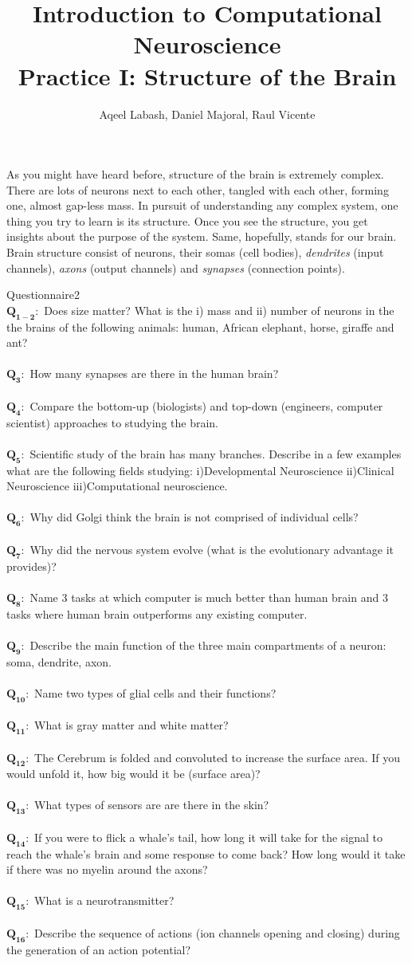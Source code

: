 \documentclass[a4paper,11pt]{article}
\author{\large{Aqeel Labash, Daniel Majoral, Raul Vicente}}
\title{\huge{Introduction to Computational Neuroscience}\\\LARGE{Practice I: Structure of the Brain}}
\newcommand{\question}[2]{\setlength\parindent{0mm}\ \\$\mathbf{Q_{#1}:}$ #2\ \\}
\begin{document}
\maketitle

As you might have heard before, structure of the brain is extremely complex. There are lots of neurons next to each other, tangled with each other, forming one, almost gap-less mass. In pursuit of understanding any complex system, one thing you try to learn is its structure. Once you see the structure, you get insights about the purpose of the system. Same, hopefully, stands for our brain. Brain structure consist of neurons, their somas (cell bodies), \emph{dendrites} (input channels), \emph{axons} (output channels) and \emph{synapses} (connection points). 


%
%
\begin{exercise}{1}{Questionnaire}{2}
\question{1-2}{Does size matter? What is the i) mass and ii) number of neurons in the the brains of the following animals: human, African elephant, horse, giraffe and ant?}
\question{3}{How many synapses are there in the human brain?}
\question{4}{Compare the bottom-up (biologists) and top-down (engineers, computer scientist) approaches to studying the brain.}
\question{5}{Scientific study of the brain has many branches. Describe in a few examples what are the following fields studying: i)Developmental Neuroscience ii)Clinical Neuroscience iii)Computational neuroscience.}
\question{6}{Why did Golgi think the brain is not comprised of individual cells?}
\question{7}{Why did the nervous system evolve (what is the evolutionary advantage it provides)?}
\question{8}{Name 3 tasks at which computer is much better than human brain and 3 tasks where human brain outperforms any existing computer.}
\question{9}{Describe the main function of the three main compartments of a neuron: soma, dendrite, axon.}
\question{10}{Name two types of glial cells and their functions?}
\question{11}{What is gray matter and white matter?}
\question{12}{The Cerebrum is folded and convoluted to increase the surface area. If you would unfold it, how big would it be (surface area)?}
\question{13}{What types of sensors are are there in the skin?}
\question{14}{If you were to flick a whale's tail, how long it will take for the signal to reach the whale's brain and some response to come back? How long would it take if there was no myelin around the axons? }
\question{15}{What is a neurotransmitter?}
\question{16}{Describe the sequence of actions (ion channels opening and closing) during the generation of an action potential?}
\end{exercise}
\end{document}
